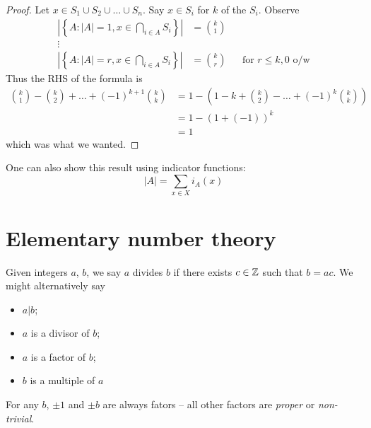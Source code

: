\documentclass{../template/note}
\begin{document}
    \begin{proof}
        Let \(x \in S_1 \cup S_2 \cup \dots \cup S_n\). Say \(x \in S_i\) for \(k\) of the \(S_i\). Observe
        \begin{align*}
            \left|\left\{A : |A| = 1, x \in \bigcap_{i \in A} S_i\right\}\right| &= \binom k 1 \\
            \vdots \\
            \left|\left\{A : |A| = r, x \in \bigcap_{i \in A} S_i\right\}\right| &= \binom k r && \text{for } r \leq k, 0 \text{ o/w}
        \end{align*}
        Thus the RHS of the formula is
        \begin{align*}
            \binom k 1 - \binom k 2 + \dots + (-1)^{k+1} \binom{k}{k} &= 1 - \left(1 - k + \binom k 2 - \dots + (-1)^k \binom k k\right) \\
            &= 1 - (1 + (-1))^k \\
            &= 1
        \end{align*}
        which was what we wanted.       
    \end{proof}
    
    \begin{remark*}
        One can also show this result using indicator functions:
        \[
            |A| = \sum_{x \in X} i_A(x)
        \]
    \end{remark*}
    
    \section{Elementary number theory}

    \begin{definition}
        Given integers \(a\), \(b\), we say \(a\) divides \(b\) if there exists \(c \in \mathbb Z\) such that \(b = ac\). We might alternatively say
        \begin{itemize}
            \item \(a | b\);
            \item \(a\) is a divisor of \(b\);
            \item \(a\) is a factor of \(b\);
            \item \(b\) is a multiple of \(a\)
        \end{itemize}
        For any \(b\), \(\pm 1\) and \(\pm b\) are always fators -- all other factors are \emph{proper} or \emph{non-trivial}.
    \end{definition}
    
\end{document}
